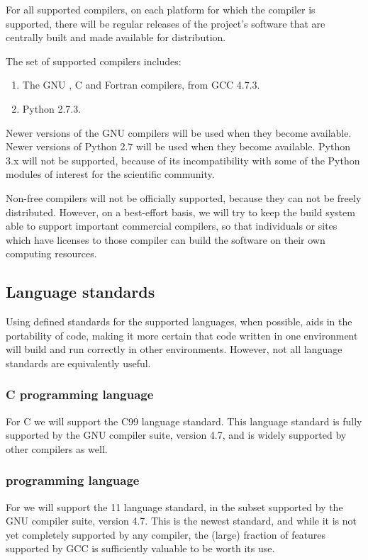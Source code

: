 \documentclass[draftmode,draftwater]{memarticle}
\begin{document}
For all supported compilers, on each platform for which the compiler is
supported, there will be regular releases of the project's software that
are centrally built and made available for distribution.

The set of supported compilers includes:
\begin{enumerate}
\item The GNU \cpp{}, C and Fortran compilers, from GCC 4.7.3.
\item Python 2.7.3.
\end{enumerate}
Newer versions of the GNU compilers will be used when they become
available. Newer versions of Python 2.7 will be used when they become
available. Python 3.x will not be supported, because of its
incompatibility with some of the Python modules of interest for the
scientific community.

Non-free compilers will not be officially supported, because they can
not be freely distributed. However, on a best-effort basis, we will try
to keep the build system able to support important commercial compilers,
so that individuals or sites which have licenses to those compiler can
build the software on their own computing resources.

\subsection{Language standards}

Using defined standards for the supported languages, when possible, aids
in the portability of code, making it more certain that code written in
one environment will build and run correctly in other environments.
However, not all language standards are equivalently useful.

\subsubsection{C programming language}

For C we will support the C99 language standard. This language standard
is fully supported by the GNU compiler suite, version 4.7, and is widely
supported by other compilers as well.

\subsubsection{\cpp{} programming language}

For \cpp{} we will support the \cpp{}11 language standard, in the subset
supported by the GNU compiler suite, version 4.7. This is the newest
\cpp{} standard, and while it is not yet completely supported by any
compiler, the (large) fraction of features supported by GCC is
sufficiently valuable to be worth its use.
\end{document}
